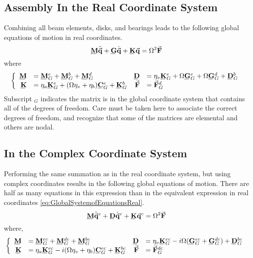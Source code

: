 \subsection{Assembly In the Real Coordinate System}
Combining all beam elements, disks, and bearings leads to the following global equations of motion in real coordinates.
\begin{equation}\label{eq:GlobalSystemofEquationsReal}
\bunderline{\mathbf{M}}\ddot{\vec{\mathbf{q}}}+\bunderline{\mathbf{G}}\dot{\vec{\mathbf{q}}}+\bunderline{\mathbf{K}}\vec{\mathbf{q}}=\Omega^2\vec{\mathbf{F}}
\end{equation}
where
\begin{equation*}
\left\{\begin{array}{rlrl}
\bunderline{\mathbf{M}}&=\bunderline{\mathbf{M}}^e_G+\bunderline{\mathbf{M}}^b_G+\bunderline{\mathbf{M}}^d_G&\bunderline{\mathbf{D}}&=\eta_v\bunderline{\mathbf{K}}^e_G+\Omega\bunderline{\mathbf{G}}^e_G+\Omega\bunderline{\mathbf{G}}^d_G+\bunderline{\mathbf{D}}^b_G\\
\bunderline{\mathbf{K}}&=\eta_a\bunderline{\mathbf{K}}^e_G+(\Omega\eta_v+\eta_b)\bunderline{\mathbf{C}}^e_G+\bunderline{\mathbf{K}}^b_G&\vec{\mathbf{F}}&=\vec{\mathbf{F}}^d_G
\end{array}\right.
\end{equation*}
Subscript $ _G $ indicates the matrix is in the global coordinate system that contains all of the degrees of freedom. Care must be taken here to associate the correct degrees of freedom, and recognize that some of the matrices are elemental and others are nodal. 
\subsection{In the Complex Coordinate System}
Performing the same summation as in the real coordinate system, but using complex coordinates results in the following global equations of motion. There are half as many equations in this expression than in the equivalent expression in real coordinates \ref{eq:GlobalSystemofEquationsReal}.
\begin{equation}\label{eq:GlobalSystemofEquationsComplex}
\bunderline{\mathbf{M}}\ddot{\vec{\mathbf{q}}}^c+\bunderline{\mathbf{D}}\dot{\vec{\mathbf{q}}}^c+\bunderline{\mathbf{K}}\vec{\mathbf{q}}^c=\Omega^2\vec{\mathbf{F}}
\end{equation}
where,
\begin{equation*}
\left\{\begin{array}{rlrl}
\bunderline{\mathbf{M}}&=\bunderline{\mathbf{M}}^{ec}_G+\bunderline{\mathbf{M}}^{dc}_G+\bunderline{\mathbf{M}}^{bc}_G&\bunderline{\mathbf{D}}&=\eta_v\bunderline{\mathbf{K}}^{ec}_G-i\Omega(\bunderline{\mathbf{G}}^{ec}_G+\bunderline{\mathbf{G}}^{dc}_G)+\bunderline{\mathbf{D}}^{bc}_G\\
\bunderline{\mathbf{K}}&=\eta_a\bunderline{\mathbf{K}}^{ec}_G-i(\Omega\eta_v+\eta_b)\bunderline{\mathbf{C}}^{ec}_G+\bunderline{\mathbf{K}}^{bc}_G&\vec{\mathbf{F}}&=\vect{F}^{dc}_G
\end{array}\right.
\end{equation*}
